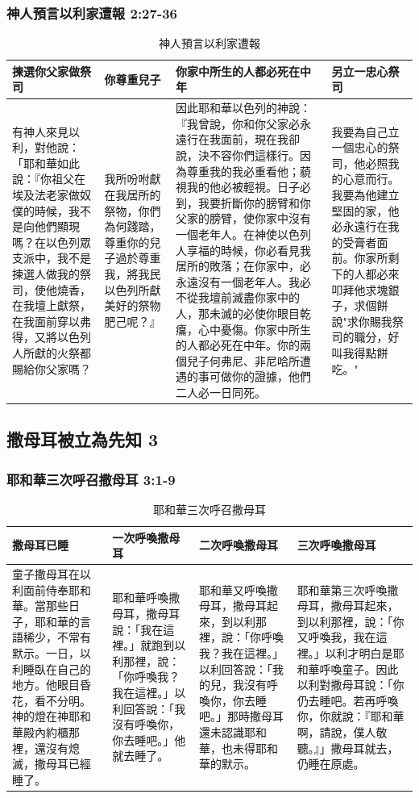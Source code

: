 \subsubsection{神人預言以利家遭報 2:27-36}
\begin{table}[H]
\centering
\begin{tabular}{p{3.75cm}|p{1.8cm}|p{7.8cm}|p{3.25cm}}\hline
揀選你父家做祭司&你尊重兒子&你家中所生的人都必死在中年&另立一忠心祭司\\\hline
有神人來見以利，對他說：「耶和華如此說：『你祖父在埃及法老家做奴僕的時候，我不是向他們顯現嗎？在以色列眾支派中，我不是揀選人做我的祭司，使他燒香，在我壇上獻祭，在我面前穿以弗得，又將以色列人所獻的火祭都賜給你父家嗎？ 
&我所吩咐獻在我居所的祭物，你們為何踐踏，尊重你的兒子過於尊重我，將我民以色列所獻美好的祭物肥己呢？』 
&因此耶和華以色列的神說：『我曾說，你和你父家必永遠行在我面前，現在我卻說，決不容你們這樣行。因為尊重我的我必重看他；藐視我的他必被輕視。日子必到，我要折斷你的膀臂和你父家的膀臂，使你家中沒有一個老年人。在神使以色列人享福的時候，你必看見我居所的敗落；在你家中，必永遠沒有一個老年人。我必不從我壇前滅盡你家中的人，那未滅的必使你眼目乾癟，心中憂傷。你家中所生的人都必死在中年。你的兩個兒子何弗尼、非尼哈所遭遇的事可做你的證據，他們二人必一日同死。
&我要為自己立一個忠心的祭司，他必照我的心意而行。我要為他建立堅固的家，他必永遠行在我的受膏者面前。你家所剩下的人都必來叩拜他求塊銀子，求個餅說"求你賜我祭司的職分，好叫我得點餅吃。"\\\hline
\end{tabular}
\caption{神人預言以利家遭報}
\end{table}  


\subsection{撒母耳被立為先知 3}
\subsubsection{耶和華三次呼召撒母耳 3:1-9}
\begin{table}[H]
\centering
\begin{tabular}{p{4.25cm}|p{}|p{}|p{}}\hline
撒母耳已睡&一次呼喚撒母耳&二次呼喚撒母耳&三次呼喚撒母耳\\\hline
童子撒母耳在以利面前侍奉耶和華。當那些日子，耶和華的言語稀少，不常有默示。一日，以利睡臥在自己的地方。他眼目昏花，看不分明。神的燈在神耶和華殿內約櫃那裡，還沒有熄滅，撒母耳已經睡了。
&耶和華呼喚撒母耳，撒母耳說：「我在這裡。」就跑到以利那裡，說：「你呼喚我？我在這裡。」以利回答說：「我沒有呼喚你，你去睡吧。」他就去睡了。
&耶和華又呼喚撒母耳，撒母耳起來，到以利那裡，說：「你呼喚我？我在這裡。」以利回答說：「我的兒，我沒有呼喚你，你去睡吧。」那時撒母耳還未認識耶和華，也未得耶和華的默示。
&耶和華第三次呼喚撒母耳，撒母耳起來，到以利那裡，說：「你又呼喚我，我在這裡。」以利才明白是耶和華呼喚童子。因此以利對撒母耳說：「你仍去睡吧。若再呼喚你，你就說：『耶和華啊，請說，僕人敬聽。』」撒母耳就去，仍睡在原處。\\\hline
\end{tabular}
\caption{耶和華三次呼召撒母耳}
\end{table}  


